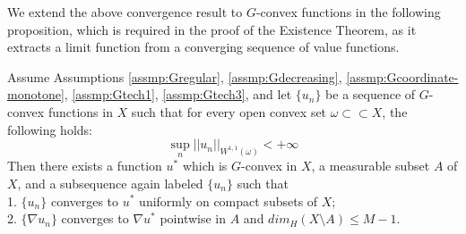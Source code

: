 {We extend the above convergence result to $G$-convex functions in the following proposition, which is required in the proof of the Existence Theorem, as it extracts a limit function from a converging sequence of value functions.}

\begin{proposition}\label{proposition:convergence}
	Assume Assumptions \ref{assmp:Gregular}, \ref{assmp:Gdecreasing}, \ref{assmp:Gcoordinate-monotone}, \ref{assmp:Gtech1}, \ref{assmp:Gtech3}, and let $\{u_n\}$ be a sequence of $G$-convex functions in $X$ such that for every open convex set $\omega \subset \subset X$, the following holds:
	\begin{equation*}
	\sup\limits_{n} ||u_n||_{W^{1,1}(\omega )} < +\infty
	\end{equation*}
	Then there exists a function $u^*$ which is  $G$-convex in $X$, a measurable subset $A$ of $X$, and a subsequence again labeled $\{u_n\}$ such that\\
	1. $\{u_n\}$ converges to $u^*$ uniformly on compact subsets of $X$;\\
	2. $\{\nabla u_n\}$ converges to $\nabla u^*$ pointwise in $A$ and $dim_{H}(X\setminus A)\le M-1$.
\end{proposition}

